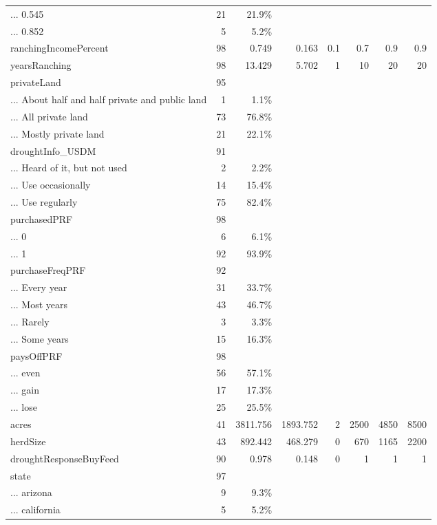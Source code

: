 \begin{table}[!htbp]
{\begin{tabular}{lrrrrrrr}
... 0.545 & 21 & 21.9\% &  &  &  &  &  \\ 
... 0.852 & 5 & 5.2\% &  &  &  &  &  \\ 
ranchingIncomePercent & 98 & 0.749 & 0.163 & 0.1 & 0.7 & 0.9 & 0.9 \\ 
yearsRanching & 98 & 13.429 & 5.702 & 1 & 10 & 20 & 20 \\ 
privateLand & 95 &  &  &  &  &  &  \\ 
... About half and half private and public land & 1 & 1.1\% &  &  &  &  &  \\ 
... All private land & 73 & 76.8\% &  &  &  &  &  \\ 
... Mostly private land & 21 & 22.1\% &  &  &  &  &  \\ 
droughtInfo\_USDM & 91 &  &  &  &  &  &  \\ 
... Heard of it, but not used & 2 & 2.2\% &  &  &  &  &  \\ 
... Use occasionally & 14 & 15.4\% &  &  &  &  &  \\ 
... Use regularly & 75 & 82.4\% &  &  &  &  &  \\ 
purchasedPRF & 98 &  &  &  &  &  &  \\ 
... 0 & 6 & 6.1\% &  &  &  &  &  \\ 
... 1 & 92 & 93.9\% &  &  &  &  &  \\ 
purchaseFreqPRF & 92 &  &  &  &  &  &  \\ 
... Every year & 31 & 33.7\% &  &  &  &  &  \\ 
... Most years & 43 & 46.7\% &  &  &  &  &  \\ 
... Rarely & 3 & 3.3\% &  &  &  &  &  \\ 
... Some years & 15 & 16.3\% &  &  &  &  &  \\ 
paysOffPRF & 98 &  &  &  &  &  &  \\ 
... even & 56 & 57.1\% &  &  &  &  &  \\ 
... gain & 17 & 17.3\% &  &  &  &  &  \\ 
... lose & 25 & 25.5\% &  &  &  &  &  \\ 
acres & 41 & 3811.756 & 1893.752 & 2 & 2500 & 4850 & 8500 \\ 
herdSize & 43 & 892.442 & 468.279 & 0 & 670 & 1165 & 2200 \\ 
droughtResponseBuyFeed & 90 & 0.978 & 0.148 & 0 & 1 & 1 & 1 \\ 
state & 97 &  &  &  &  &  &  \\ 
... arizona & 9 & 9.3\% &  &  &  &  &  \\ 
... california & 5 & 5.2\% &  &  &  &  &  \\ 

\end{tabular}}
\end{table}

